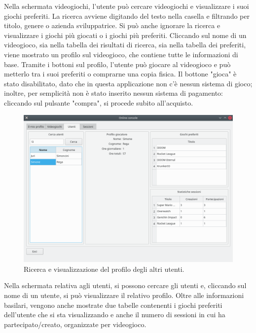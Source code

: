 \documentclass[a4paper,12pt]{report}
\begin{document}
Nella schermata videogiochi, l'utente può cercare videogiochi e visualizzare i suoi giochi preferiti. La ricerca avviene digitando del testo nella casella e filtrando per titolo, genere o azienda sviluppatrice. Si può anche ignorare la ricerca e visualizzare i giochi più giocati o i giochi più preferiti. Cliccando sul nome di un videogioco, sia nella tabella dei risultati di ricerca, sia nella tabella dei preferiti, viene mostrato un profilo sul videogioco, che contiene tutte le informazioni di base. Tramite i bottoni sul profilo, l'utente può giocare al videogioco e può metterlo tra i suoi preferiti o comprarne una copia fisica. Il bottone "gioca" è stato disabilitato, dato che in questa applicazione non c'è nessun sistema di gioco; inoltre, per semplicità non è stato inserito nessun sistema di pagamento: cliccando sul pulsante "compra", si procede subito all'acquisto.

\begin{figure}[H]
\centering{}
\includegraphics[width=12cm]{screen_users.png}
\caption{Ricerca e visualizzazione del profilo degli altri utenti.}
\label{img:screen_login}
\end{figure}

Nella schermata relativa agli utenti, si possono cercare gli utenti e, cliccando sul nome di un utente, si può visualizzare il relativo profilo. Oltre alle informazioni basilari, vengono anche mostrate due tabelle contenenti i giochi preferiti dell'utente che si sta visualizzando e anche il numero di sessioni in cui ha partecipato/creato, organizzate per videogioco.
\end{document}
